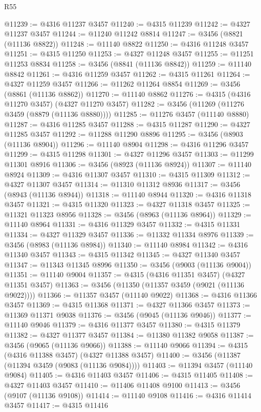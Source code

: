 \begin{lexlean}{R55}
\begin{coremodule}
@11239 := @4316 @11237 @3457
@11240 := @4315 @11239
@11242 := @4327 @11237 @3457
@11244 := @11240 @11242 @8814
@11247 := @3456 (@8821 (@11136 @8822))
@11248 := @11140 @8822
@11250 := @4316 @11248 @3457
@11251 := @4315 @11250
@11253 := @4327 @11248 @3457
@11255 := @11251 @11253 @8834
@11258 := @3456 (@8841 (@11136 @8842))
@11259 := @11140 @8842
@11261 := @4316 @11259 @3457
@11262 := @4315 @11261
@11264 := @4327 @11259 @3457
@11266 := @11262 @11264 @8854
@11269 := @3456 (@8861 (@11136 @8862))
@11270 := @11140 @8862
@11276 := @4315 (@4316 @11270 @3457) (@4327 @11270 @3457)
@11282 := @3456 (@11269 (@11276 @3459 (@8879 (@11136 @8880))))
@11285 := @11276 @3457 (@11140 @8880)
@11287 := @4316 @11285 @3457
@11288 := @4315 @11287
@11290 := @4327 @11285 @3457
@11292 := @11288 @11290 @8896
@11295 := @3456 (@8903 (@11136 @8904))
@11296 := @11140 @8904
@11298 := @4316 @11296 @3457
@11299 := @4315 @11298
@11301 := @4327 @11296 @3457
@11303 := @11299 @11301 @8916
@11306 := @3456 (@8923 (@11136 @8924))
@11307 := @11140 @8924
@11309 := @4316 @11307 @3457
@11310 := @4315 @11309
@11312 := @4327 @11307 @3457
@11314 := @11310 @11312 @8936
@11317 := @3456 (@8943 (@11136 @8944))
@11318 := @11140 @8944
@11320 := @4316 @11318 @3457
@11321 := @4315 @11320
@11323 := @4327 @11318 @3457
@11325 := @11321 @11323 @8956
@11328 := @3456 (@8963 (@11136 @8964))
@11329 := @11140 @8964
@11331 := @4316 @11329 @3457
@11332 := @4315 @11331
@11334 := @4327 @11329 @3457
@11336 := @11332 @11334 @8976
@11339 := @3456 (@8983 (@11136 @8984))
@11340 := @11140 @8984
@11342 := @4316 @11340 @3457
@11343 := @4315 @11342
@11345 := @4327 @11340 @3457
@11347 := @11343 @11345 @8996
@11350 := @3456 (@9003 (@11136 @9004))
@11351 := @11140 @9004
@11357 := @4315 (@4316 @11351 @3457) (@4327 @11351 @3457)
@11363 := @3456 (@11350 (@11357 @3459 (@9021 (@11136 @9022))))
@11366 := @11357 @3457 (@11140 @9022)
@11368 := @4316 @11366 @3457
@11369 := @4315 @11368
@11371 := @4327 @11366 @3457
@11373 := @11369 @11371 @9038
@11376 := @3456 (@9045 (@11136 @9046))
@11377 := @11140 @9046
@11379 := @4316 @11377 @3457
@11380 := @4315 @11379
@11382 := @4327 @11377 @3457
@11384 := @11380 @11382 @9058
@11387 := @3456 (@9065 (@11136 @9066))
@11388 := @11140 @9066
@11394 := @4315 (@4316 @11388 @3457) (@4327 @11388 @3457)
@11400 := @3456 (@11387 (@11394 @3459 (@9083 (@11136 @9084))))
@11403 := @11394 @3457 (@11140 @9084)
@11405 := @4316 @11403 @3457
@11406 := @4315 @11405
@11408 := @4327 @11403 @3457
@11410 := @11406 @11408 @9100
@11413 := @3456 (@9107 (@11136 @9108))
@11414 := @11140 @9108
@11416 := @4316 @11414 @3457
@11417 := @4315 @11416

\end{coremodule}
\end{lexlean}
